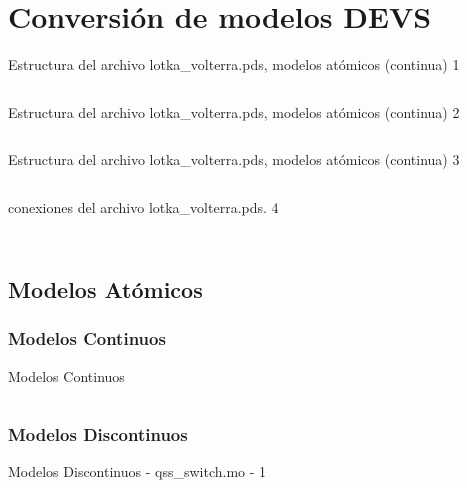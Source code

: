 \documentclass{beamer}
\begin{document}
\chapter{Conversión de modelos DEVS}
\begin{frame}[fragile]{Estructura del archivo lotka\_volterra.pds, modelos atómicos (continua) 1}
        \inputminted[linenos,breaklines=true,lastline=12]{modelica}{src/lotka_volterra.pds}
\end{frame}

\begin{frame}[fragile]{Estructura del archivo lotka\_volterra.pds, modelos atómicos (continua) 2}
        \inputminted[linenos,breaklines=true,firstline=13,lastline=22]{modelica}{src/lotka_volterra.pds}
\end{frame}

\begin{frame}[fragile]{Estructura del archivo lotka\_volterra.pds, modelos atómicos (continua) 3}
        \inputminted[linenos,breaklines=true,firstline=23,lastline=32]{modelica}{src/lotka_volterra.pds}
\end{frame}


\begin{frame}{conexiones del archivo lotka\_volterra.pds. 4}
\begin{minipage}{0.4\textwidth}
	\inputminted[firstline=33,lastline=38,linenos,breaklines=true]{modelica}{src/lotka_volterra.pds}
\end{minipage}
\begin{minipage}{0.4\textwidth}
	\inputminted[firstline=39,lastline=52,linenos,breaklines=true]{modelica}{src/lotka_volterra.pds}
        \end{minipage}
\end{frame}

\section{Modelos Atómicos}
\subsection{Modelos Continuos}
\begin{frame}{Modelos Continuos}
        \inputminted[]{modelica}{../../data/qss/qss_wsum.mo}
\end{frame}

\subsection{Modelos Discontinuos}
\begin{frame}[fragile]{Modelos Discontinuos - qss\_switch.mo - 1}
        \inputminted[linenos,lastline=8]{modelica}{../../data/qss/qss_switch.mo}
\end{frame}
\end{document}
